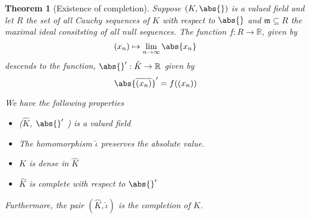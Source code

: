 \documentclass{article}
\newtheorem{theorem}{Theorem}[section]
\newcommand{\mfrak}[1]{\mathfrak{#1}}
\newcommand{\mbb}[1]{\mathbb{#1}}
\numberwithin{equation}{section}
\begin{document}
\begin{theorem}[Existence of completion]
    Suppose $(K, \abs{})$ is a valued field and let $R$ the set of all Cauchy sequences of $K$ with respect to $\abs{}$ and $\mfrak m \subseteq R$ the maximal ideal consitsting of all null sequences. The function $f : R \to \mbb R$, given by
    $$(x_n) \mapsto \lim_{n \to \infty} \abs{x_n}$$
    descends to the function, $\abs{}' : \hat K \to \mbb R$ given by
    $$\abs{\overline {(x_n)}}' = f( (x_n) )$$

    We have the following properties
    \begin{itemize}
        \item ($\hat K$, $\abs{}'$ ) is a valued field
        \item The homomorphism $\hat \iota$ preserves the absolute value.
        \item $K$ is dense in $\hat K$
        \item $\hat K$ is complete with respect to $\abs{}'$
    \end{itemize}

    Furthermore, the pair $(\hat K, \hat \iota)$ is the completion of $K$.

\end{theorem}
\end{document}

